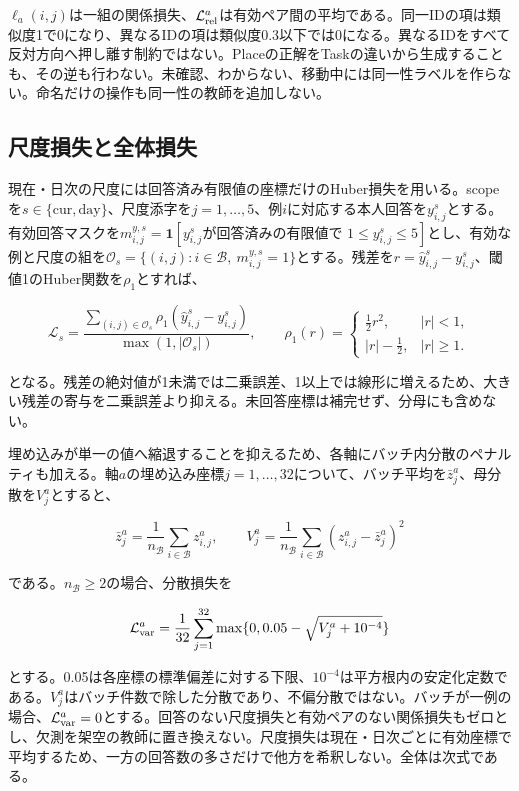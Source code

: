 \(\ell_a(i,j)\)は一組の関係損失、\(\mathcal L_{\rm rel}^a\)は有効ペア間の平均である。同一IDの項は類似度1で0になり、異なるIDの項は類似度0.3以下では0になる。異なるIDをすべて反対方向へ押し離す制約ではない。Placeの正解をTaskの違いから生成することも、その逆も行わない。未確認、わからない、移動中には同一性ラベルを作らない。命名だけの操作も同一性の教師を追加しない。

\subsection{尺度損失と全体損失}
\label{sec:scale-and-total-loss}

現在・日次の尺度には回答済み有限値の座標だけのHuber損失を用いる\autocite{huber1964robust}。scopeを\(s\in\{\mathrm{cur},\mathrm{day}\}\)、尺度添字を\(j=1,\ldots,5\)、例\(i\)に対応する本人回答を\(y_{i,j}^s\)とする。有効回答マスクを\(m_{i,j}^{y,s}=\mathbf1[y_{i,j}^s\text{が回答済みの有限値で }1\le y_{i,j}^s\le5]\)とし、有効な例と尺度の組を\(\mathcal O_s=\{(i,j):i\in\mathcal B,\ m_{i,j}^{y,s}=1\}\)とする。残差を\(r=\hat y_{i,j}^{s}-y_{i,j}^{s}\)、閾値1のHuber関数を\(\rho_1\)とすれば、

\[
\mathcal L_s=\frac{\sum_{(i,j)\in\mathcal O_s}\rho_1(\hat y_{i,j}^{s}-y_{i,j}^{s})}{\max(1,|\mathcal O_s|)},\qquad
\rho_1(r)=\begin{cases}\tfrac12r^2,&|r|<1,\\|r|-\tfrac12,&|r|\ge1.\end{cases}
\]

となる。残差の絶対値が1未満では二乗誤差、1以上では線形に増えるため、大きい残差の寄与を二乗誤差より抑える。未回答座標は補完せず、分母にも含めない。

埋め込みが単一の値へ縮退することを抑えるため、各軸にバッチ内分散のペナルティも加える。軸\(a\)の埋め込み座標\(j=1,\ldots,32\)について、バッチ平均を\(\bar z_j^a\)、母分散を\(V_j^a\)とすると、

\[
\bar z_j^a=\frac1{n_{\mathcal B}}\sum_{i\in\mathcal B}z_{i,j}^a,\qquad
V_j^a=\frac1{n_{\mathcal B}}\sum_{i\in\mathcal B}
(z_{i,j}^a-\bar z_j^a)^2
\]

である。\(n_{\mathcal B}\ge2\)の場合、分散損失を

\[
\mathcal L_{\rm var}^{a}=\frac1{32}\sum_{j=1}^{32}
\max\{0,0.05-\sqrt{V_j^a+10^{-4}}\}
\]

とする。0.05は各座標の標準偏差に対する下限、\(10^{-4}\)は平方根内の安定化定数である。\(V_j^a\)はバッチ件数で除した分散であり、不偏分散ではない。バッチが一例の場合、\(\mathcal L_{\rm var}^a=0\)とする。回答のない尺度損失と有効ペアのない関係損失もゼロとし、欠測を架空の教師に置き換えない。尺度損失は現在・日次ごとに有効座標で平均するため、一方の回答数の多さだけで他方を希釈しない。全体は次式である。

